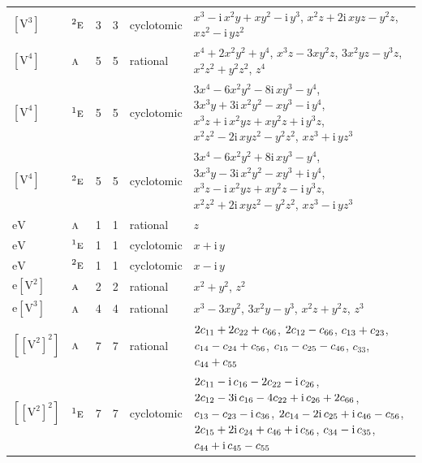 \documentclass[10pt,a4paper]{article}
\numberwithin{equation}{section}
\newcommand{\irr}[1]{\text{\normalfont\scshape #1}}
\newcommand{\conjpair}[1]{{}^{#1}}
\newcommand{\iunit}{\mathrm{i}}
\newcommand{\jahn}[1]{\mathrm{#1}}
\newlength{\fillwidth}\newlength{\cellwidth}\newlength{\colwidth}
\newcommand{\signbreak}{\penalty100\relax}
\begin{document}
{\begin{longtable}{@{}llrrl>{\RaggedRight\arraybackslash}p{\fillwidth}@{}}
$\jahn{[V^{3}]}$ & $\conjpair{2}\irr{e}$ & 3 & 3 & cyclotomic & $x^{3} - \iunit{}\,x^{2}y + xy^{2} - \iunit{}\,y^{3}$, $x^{2}z + 2\iunit{}\,xyz - y^{2}z$, $xz^{2} - \iunit{}\,yz^{2}$\\
$\jahn{[V^{4}]}$ & $\irr{a}$ & 5 & 5 & rational & $x^{4} + 2x^{2}y^{2} + y^{4}$, $x^{3}z - 3xy^{2}z$, $3x^{2}yz - y^{3}z$, $x^{2}z^{2} + y^{2}z^{2}$, $z^{4}$\\
$\jahn{[V^{4}]}$ & $\conjpair{1}\irr{e}$ & 5 & 5 & cyclotomic & $3x^{4} - 6x^{2}y^{2} - 8\iunit{}\,xy^{3} - y^{4}$, $3x^{3}y + 3\iunit{}\,x^{2}y^{2} - xy^{3} - \iunit{}\,y^{4}$, $x^{3}z + \iunit{}\,x^{2}yz + xy^{2}z + \iunit{}\,y^{3}z$, $x^{2}z^{2} - 2\iunit{}\,xyz^{2} - y^{2}z^{2}$, $xz^{3} + \iunit{}\,yz^{3}$\\
$\jahn{[V^{4}]}$ & $\conjpair{2}\irr{e}$ & 5 & 5 & cyclotomic & $3x^{4} - 6x^{2}y^{2} + 8\iunit{}\,xy^{3} - y^{4}$, $3x^{3}y - 3\iunit{}\,x^{2}y^{2} - xy^{3} + \iunit{}\,y^{4}$, $x^{3}z - \iunit{}\,x^{2}yz + xy^{2}z - \iunit{}\,y^{3}z$, $x^{2}z^{2} + 2\iunit{}\,xyz^{2} - y^{2}z^{2}$, $xz^{3} - \iunit{}\,yz^{3}$\\
$\jahn{eV}$ & $\irr{a}$ & 1 & 1 & rational & $z$\\
$\jahn{eV}$ & $\conjpair{1}\irr{e}$ & 1 & 1 & cyclotomic & $x + \iunit{}\,y$\\
$\jahn{eV}$ & $\conjpair{2}\irr{e}$ & 1 & 1 & cyclotomic & $x - \iunit{}\,y$\\
$\jahn{e[V^{2}]}$ & $\irr{a}$ & 2 & 2 & rational & $x^{2} + y^{2}$, $z^{2}$\\
$\jahn{e[V^{3}]}$ & $\irr{a}$ & 4 & 4 & rational & $x^{3} - 3xy^{2}$, $3x^{2}y - y^{3}$, $x^{2}z + y^{2}z$, $z^{3}$\\
$\jahn{[[V^{2}]^{2}]}$ & $\irr{a}$ & 7 & 7 & rational & $2c_{11} +\signbreak 2c_{22} +\signbreak c_{66}$, $2c_{12} -\signbreak c_{66}$, $c_{13} +\signbreak c_{23}$, $c_{14} -\signbreak c_{24} +\signbreak c_{56}$, $c_{15} -\signbreak c_{25} -\signbreak c_{46}$, $c_{33}$, $c_{44} +\signbreak c_{55}$\\
$\jahn{[[V^{2}]^{2}]}$ & $\conjpair{1}\irr{e}$ & 7 & 7 & cyclotomic & $2c_{11} -\signbreak \iunit{}\,c_{16} -\signbreak 2c_{22} -\signbreak \iunit{}\,c_{26}$, $2c_{12} -\signbreak 3\iunit{}\,c_{16} -\signbreak 4c_{22} +\signbreak \iunit{}\,c_{26} +\signbreak 2c_{66}$, $c_{13} -\signbreak c_{23} -\signbreak \iunit{}\,c_{36}$, $2c_{14} -\signbreak 2\iunit{}\,c_{25} +\signbreak \iunit{}\,c_{46} -\signbreak c_{56}$, $2c_{15} +\signbreak 2\iunit{}\,c_{24} +\signbreak c_{46} +\signbreak \iunit{}\,c_{56}$, $c_{34} -\signbreak \iunit{}\,c_{35}$, $c_{44} +\signbreak \iunit{}\,c_{45} -\signbreak c_{55}$\\

\end{longtable}}
\end{document}
